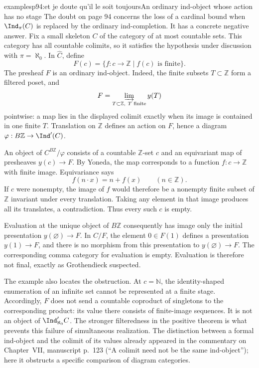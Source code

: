 \begin{dcomment}{examples}{p94:et je doute qu'il le soit toujours}{An ordinary ind-object whose action has no stage}
The doubt on page 94 concerns the loss of a cardinal bound when $\Ind_\pi(C)$ is replaced by the ordinary ind-completion. It has a concrete negative answer. Fix a small skeleton $C$ of the category of at most countable sets. This category has all countable colimits, so it satisfies the hypothesis under discussion with $\pi=\aleph_0$. In $\widehat C$, define
\[
F(c)=\{f:c\longrightarrow\mathbb Z\mid f(c)\text{ is finite}\}.
\]
The presheaf $F$ is an ordinary ind-object. Indeed, the finite subsets $T\subset\mathbb Z$ form a filtered poset, and
\[
F=\varinjlim_{T\subset\mathbb Z,\ T\text{ finite}}y(T)
\]
pointwise: a map lies in the displayed colimit exactly when its image is contained in one finite $T$. Translation on $\mathbb Z$ defines an action on $F$, hence a diagram $\varphi:B\mathbb Z\to\Ind'(C)$.

An object of $C^{B\mathbb Z}/\varphi$ consists of a countable $\mathbb Z$-set $c$ and an equivariant map of presheaves $y(c)\to F$. By Yoneda, the map corresponds to a function $f:c\to\mathbb Z$ with finite image. Equivariance says
\[
f(n\cdot x)=n+f(x)\qquad(n\in\mathbb Z).
\]
If $c$ were nonempty, the image of $f$ would therefore be a nonempty finite subset of $\mathbb Z$ invariant under every translation. Taking any element in that image produces all its translates, a contradiction. Thus every such $c$ is empty.

Evaluation at the unique object of $B\mathbb Z$ consequently has image only the initial presentation $y(\varnothing)\to F$. In $C/F$, the element $0\in F(1)$ defines a presentation $y(1)\to F$, and there is no morphism from this presentation to $y(\varnothing)\to F$. The corresponding comma category for evaluation is empty. Evaluation is therefore not final, exactly as Grothendieck suspected.

The example also locates the obstruction. At $c=\mathbb N$, the identity-shaped enumeration of an infinite set cannot be represented at a finite stage. Accordingly, $F$ does not send a countable coproduct of singletons to the corresponding product: its value there consists of finite-image sequences. It is not an object of $\Ind'_{\aleph_0}C$. The stronger filteredness in the positive theorem is what prevents this failure of simultaneous realization. The distinction between a formal ind-object and the colimit of its values already appeared in the commentary on Chapter~VII, manuscript p.~123 (``A colimit need not be the same ind-object''); here it obstructs a specific comparison of diagram categories.
\end{dcomment}


